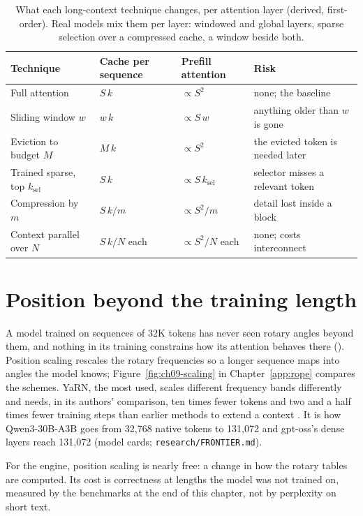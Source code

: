 \begin{table}[ht]
\centering
\small
\begin{tabular}{@{}lll>{\raggedright\arraybackslash}p{5.2cm}@{}}
\toprule
Technique & Cache per sequence & Prefill attention & Risk \\
\midrule
Full attention & $S\,k$ & $\propto S^{2}$ & none; the baseline \\
Sliding window $w$ & $w\,k$ & $\propto S\,w$ & anything older than $w$ is gone \\
Eviction to budget $M$ & $M\,k$ & $\propto S^{2}$ & the evicted token is needed later \\
Trained sparse, top $k_{\text{sel}}$ & $S\,k$ & $\propto S\,k_{\text{sel}}$ & selector misses a relevant token \\
Compression by $m$ & $S\,k/m$ & $\propto S^{2}/m$ & detail lost inside a block \\
Context parallel over $N$ & $S\,k/N$ each & $\propto S^{2}/N$ each & none; costs interconnect \\
\bottomrule
\end{tabular}
\caption{What each long-context technique changes, per attention layer
(derived, first-order). Real models mix them per layer: windowed and global
layers, sparse selection over a compressed cache, a window beside both.}
\label{tab:ch28-long-context-costs}
\end{table}

\section{Position beyond the training length}

A model trained on sequences of 32K tokens has never seen rotary angles
beyond them, and nothing in its training constrains how its attention behaves
there (). Position scaling rescales the rotary frequencies so a longer
sequence maps into angles the model knows; Figure~\ref{fig:ch09-scaling} in
Chapter~\ref{app:rope} compares the schemes. YaRN, the most used, scales different
frequency bands differently and needs, in its authors' comparison, ten times
fewer tokens and two and a half times fewer training steps than earlier
methods to extend a context \cite{peng2024yarn}. It is how Qwen3-30B-A3B goes
from 32,768 native tokens to 131,072 and gpt-oss's dense layers reach 131,072
(model cards; \texttt{research/FRONTIER.md}).

For the engine, position scaling is nearly free: a change in how the rotary
tables are computed. Its cost is correctness at lengths the model was not
trained on, measured by the benchmarks at the end of this chapter, not by
perplexity on short text.

